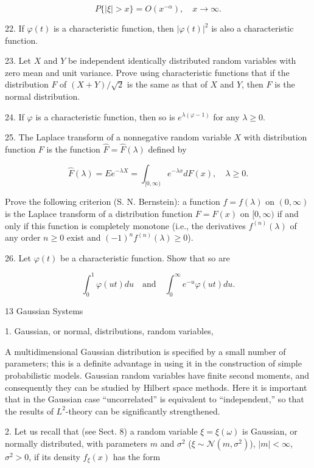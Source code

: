 $$P\{|\xi| > x\} = O(x^{-\alpha}), \quad x \to \infty.$$

22. If $\varphi(t)$ is a characteristic function, then $|\varphi(t)|^2$ is also a characteristic function.

23. Let $X$ and $Y$ be independent identically distributed random variables with zero mean and unit variance. Prove using characteristic functions that if the distribution $F$ of $(X + Y)/\sqrt{2}$ is the same as that of $X$ and $Y$, then $F$ is the normal distribution.

24. If $\varphi$ is a characteristic function, then so is $e^{\lambda(\varphi-1)}$ for any $\lambda \geq 0$.

25. The Laplace transform of a nonnegative random variable $X$ with distribution function $F$ is the function $\hat{F} = \hat{F}(\lambda)$ defined by

$$\hat{F}(\lambda) = E e^{-\lambda X} = \int_{[0, \infty)} e^{-\lambda x} dF(x), \quad \lambda \geq 0.$$

Prove the following criterion (S. N. Bernstein): a function $f = f(\lambda)$ on $(0, \infty)$ is the Laplace transform of a distribution function $F = F(x)$ on $[0, \infty)$ if and only if this function is completely monotone (i.e., the derivatives $f^{(n)}(\lambda)$ of any order $n \geq 0$ exist and $(-1)^n f^{(n)}(\lambda) \geq 0$).

26. Let $\varphi(t)$ be a characteristic function. Show that so are

$$\int_0^1 \varphi(ut) du \quad \text{and} \quad \int_0^\infty e^{-u} \varphi(ut) du.$$

13 Gaussian Systems

1. Gaussian, or normal, distributions, random variables,

A multidimensional Gaussian distribution is specified by a small number of parameters; this is a definite advantage in using it in the construction of simple probabilistic models. Gaussian random variables have finite second moments, and consequently they can be studied by Hilbert space methods. Here it is important that in the Gaussian case “uncorrelated” is equivalent to “independent,” so that the results of $L^2$-theory can be significantly strengthened.

2. Let us recall that (see Sect. 8) a random variable $\xi = \xi(\omega)$ is Gaussian, or normally distributed, with parameters $m$ and $\sigma^2$ ($\xi \sim \mathcal{N}(m, \sigma^2)$), $|m| < \infty$, $\sigma^2 > 0$, if its density $f_\xi(x)$ has the form

